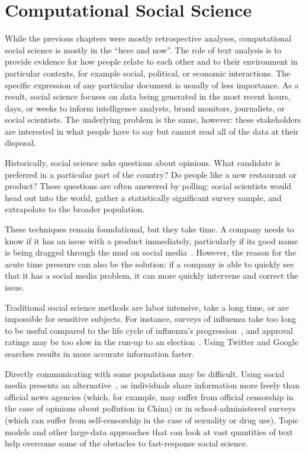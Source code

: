 
\chapter{Computational Social Science}
\label{ch:css}

While the previous chapters were mostly retrospective analyses,
computational social science is mostly in the ``here and now''.  The
role of text analysis is to provide evidence for how people relate to
each other and to their environment in particular contexts, for
example social, political, or economic interactions.  The specific
expression of any particular document is usually of less importance.
As a result, social science focuses on data being generated in the
most recent hours, days, or weeks to inform intelligence analysts, brand
monitors, journalists, or social scientists.  The underlying problem
is the same, however: these stakeholders are interested in what people
have to say but cannot read all of the data at their disposal.

Historically, social science asks questions about opinions. What candidate is
preferred in a particular part of the country? Do people like a
new restaurant or product?  These questions are often answered by
polling: social scientists would head out into the world, gather a
statistically significant survey sample, and extrapolate to the
broader population.

These techniques remain foundational, but they take time.  A
company needs to know if it has an issue with a product immediately,
particularly if its good name is being dragged through the mud on
social media~\citep{bowen-16}.  However, the reason for the acute time
pressure can also be the solution: if a company is able to quickly see
that it has a social media problem, it can more quickly intervene and
correct the issue.

Traditional social science methods are labor intensive, take a long
time, or are impossible for sensitive subjects.  For instance, surveys
of influenza take too long to be useful compared to the life cycle of
influenza's progression~\citep{broniatowsky-15}, and approval ratings
may be too slow in the run-up to an election~\citep{oconnor-10}.  Using
Twitter and Google searches results in more accurate information
faster.

Directly communicating with some
populations may be difficult.  Using social media presents an
alternative~\citep{wang:paul:dredze-15}, as individuals share
information more freely than official news agencies (which, for example, may suffer
from official censorship in the case of opinions about pollution in China) or in
school-administered surveys (which can suffer from self-censorship in
the case of sexuality or drug use).  Topic models and other large-data approaches
that can look at vast quantities of text help overcome some of the
obstacles to fast-response social science.

